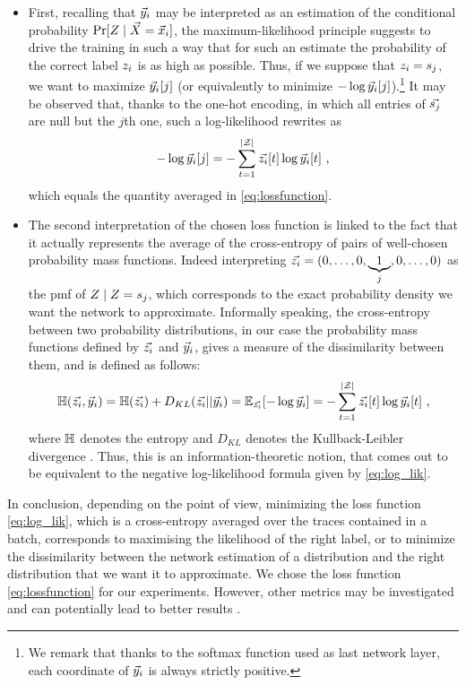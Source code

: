 \begin{itemize}
\item First, recalling that $\vec{y}_i$ may be interpreted as an estimation of the conditional probability $\prob[\given{\sensRandVar}{\vaLeakVec=\vLeakVec_i}]$, the maximum-likelihood principle suggests to drive the training in such a way that for such an estimate the probability of the correct label $z_i$ is as high as possible. Thus, if we suppose that $z_i = s_{j}$, we want to maximize $\vec{y}_i[j]$ (or equivalently to minimize $-\log{\ensuremath {\vec{y}}_i[j]}$).\footnote{We remark that thanks to the softmax function used as last network layer, each coordinate of $\vec{y}_i$ is always strictly positive.} It may be observed that, thanks to the one-hot encoding, in which all entries of $\vec{s_{j}}$ are null but the $j$th one, such a log-likelihood rewrites as 
\begin{equation}\label{eq:log_lik}
-\log{\ensuremath {\vec{y}}_i[j]} = -\sum_{t=1}^{|\mathcal{Z}|}\vec{z_i}[t]\log{\ensuremath {\vec{y}}_i[t]} \mbox{ ,}
\end{equation}
which equals the quantity averaged in \eqref{eq:lossfunction}.
\item The second interpretation of the chosen loss function is linked to the fact that it actually represents the average of  the cross-entropy of pairs of well-chosen probability mass functions. Indeed interpreting $\vec{z_i} = (0,\ldots , 0,\underbrace{1}_{j},0,\dots,0)$ as the pmf of $\given{\sensRandVar}{\sensRandVar = \sensVarValue{j}}$, which corresponds to the exact probability density we want the network to approximate. Informally speaking, the cross-entropy between two probability distributions, in our case the probability mass functions defined by $\vec{z_i}$ and $\vec{y}_i$, gives a measure of the dissimilarity between them, and is defined as follows:
\begin{equation}\label{eq:crossentropy}
\mathbb{H}(\vec{z_i}, \vec{y}_i) = \mathbb{H}(\vec{z_i}) + D_{KL}(\vec{z_i} || \vec{y}_i) = \mathbb{E}_{\vec{z_i}}[-\log{\ensuremath {\vec{y}}_i}] = -\sum_{t=1}^{|\mathcal{Z}|}\vec{z_i}[t]\log{\ensuremath {\vec{y}}_i[t]} \mbox{ ,}
\end{equation}
where $\mathbb{H}$ denotes the entropy and $D_{KL}$ denotes the Kullback-Leibler divergence \cite{christopher2006pattern}. Thus, this is an information-theoretic notion, that comes out to be equivalent to the negative log-likelihood formula given by \eqref{eq:log_lik}. 
\end{itemize}
In conclusion, depending on the point of view, minimizing the loss function \eqref{eq:log_lik}, which is a cross-entropy averaged over the traces contained in a batch, corresponds to maximising the likelihood of the right label, or to minimize the dissimilarity between the network estimation of a distribution and the right distribution that we want it to approximate. 
We chose the loss function \eqref{eq:lossfunction} for our experiments. However, other metrics may be investigated and can
potentially lead to better results \cite{MHK10,SSZU15}. \\

